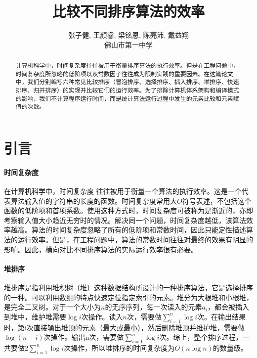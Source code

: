 \documentclass[UTF8]{ctexart}
\title{比较不同排序算法的效率}
\author{张子健, 王颜睿, 梁铭恩, 陈亮沛, 戴益翔 \\ 佛山市第一中学}
\begin{document}
\maketitle
\begin{abstract}
	计算机科学中，时间复杂度往往被用于衡量排序算法的执行效率。但是在工程问题中，时间复杂度所忽略的低阶项以及常数因子往往成为限制实践的重要因素。在这篇论文中，我们分别编写六种常见比较排序（冒泡排序、选择排序、插入排序、堆排序、快速排序、归并排序）的实现并比较它们的运行效率。为了排除计算机体系架构和编译模式的影响，我们不计算程序运行时间，而是统计算法运行过程中发生的元素比较和元素赋值的次数。
\end{abstract}

\section{引言}

\paragraph{时间复杂度}
在计算机科学中，时间复杂度 \cite{cormen1990introduction} 往往被用于衡量一个算法的执行效率。这是一个代表算法输入值的字符串的长度的函数。时间复杂度常用大$O$符号表述，不包括这个函数的低阶项和首项系数。使用这种方式时，时间复杂度可被称为是渐近的，亦即考察输入值大小趋近无穷时的情况。解决同一个问题，时间复杂度越低，该算法效率越高。算法的时间复杂度忽略了所有的低阶项和常数时间，因此只能定性描述算法的运行效率。但是，在工程问题中，算法的常数时间往往对最终的效果有明显的影响。因此，横向对比不同排序算法的实际运行效率很有必要。

\paragraph{堆排序}
堆排序\cite{cormen1990introduction}是指利用堆积树（堆）这种数据结构所设计的一种排序算法，它是选择排序的一种。可以利用数组的特点快速定位指定索引的元素。堆分为大根堆和小根堆，是完全二叉树。对于一个大小为$n$的无序序列，每一次读入的元素$a_i$，都会被插入到堆中，维护堆需要$\log i$次操作。读入$n$次，需要做$\sum_{i=1}^{n}\log i$次。在输出结果时，第i次直接输出堆顶的元素（最大或最小），然后删除堆顶并维护堆，需要做$\log (n-i)$次操作。输出n次，需要做$\sum_{i=1}^{n}\log i$次。综上，整个排序过程，一共要做$2\sum_{i=1}^{n}\log i$次操作，所以堆排序的时间复杂度为$O(n \log n)$的数量级。
\end{document}
